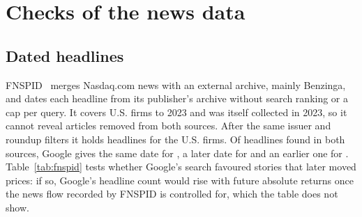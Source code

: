 \section{Checks of the news data}\label{app:fnspid}
\subsection{Dated headlines}
FNSPID~\cite{fnspid} merges Nasdaq.com news with an external archive, mainly Benzinga, and dates each headline from its publisher's archive without search ranking or a cap per query. It covers U.S. firms to 2023 and was itself collected in 2023, so it cannot reveal articles removed from both sources. After the same issuer and roundup filters it holds \FnWire{} headlines for the \FirmsUS{} U.S. firms. Of \FnMatched{} headlines found in both sources, Google gives the same date for \FnSameDay{}, a later date for \FnLater{} and an earlier one for \FnEarlier{}. Table~\ref{tab:fnspid} tests whether Google's search favoured stories that later moved prices: if so, Google's headline count would rise with future absolute returns once the news flow recorded by FNSPID is controlled for, which the table does not show.
\begin{table}[H]\centering\footnotesize
\caption{Does the 2026 search favour stories that later moved prices? Fama--MacBeth regressions of firm-demeaned $\log(1+\text{headlines})$ per firm and week on standardised regressors, U.S. firms, test weeks 2015--2023. Coefficients in \% per standard deviation, Newey--West $t$-statistics in parentheses. $|r|$ is the absolute return relative to the average stock; week~0 ends at the first close after the decision. (1) FNSPID headlines; (2) and (3) Google headlines.}\label{tab:fnspid}\end{table}

